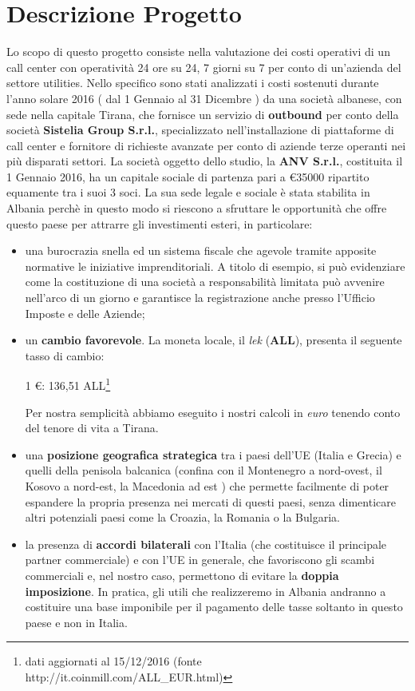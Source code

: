 \chapter{Descrizione Progetto}
\renewcommand{\thesection}{\arabic{section}}
Lo scopo di questo progetto consiste nella valutazione dei costi operativi di un call center con operatività 24 ore su 24, 7 giorni su 7 per conto di un'azienda del settore utilities. \newline
Nello specifico sono stati analizzati i costi sostenuti durante l'anno solare 2016 ( dal 1 Gennaio al 31 Dicembre ) da una società albanese, con sede nella capitale Tirana, che fornisce un servizio di \textbf{outbound} per conto della società \textbf{Sistelia Group S.r.l.}, specializzato nell'installazione di piattaforme di call center e fornitore di richieste avanzate per conto di aziende terze operanti nei più disparati settori. \newline
La società oggetto dello studio, la \textbf{\ac{ANV} S.r.l.}, costituita il 1 Gennaio 2016, ha un capitale sociale di partenza pari a \euro 35000 ripartito equamente tra i suoi 3 soci. La sua sede legale e sociale è stata stabilita in Albania perchè in questo modo si riescono a sfruttare le opportunità che offre questo paese per attrarre gli investimenti esteri, in particolare:
\begin{itemize}
\item una burocrazia snella ed un sistema fiscale che agevole tramite apposite normative le iniziative imprenditoriali.
		A titolo di esempio, si può evidenziare come la costituzione di una società a responsabilità limitata può avvenire nell'arco di un giorno e garantisce la registrazione anche presso l'Ufficio Imposte e delle Aziende;
\item un \textbf{cambio favorevole}. La moneta locale, il \textit{lek} (\textbf{ALL}), presenta il seguente tasso di cambio:
	\begin{center}
		1 \euro : 136,51 ALL\footnote{dati aggiornati al 15/12/2016 (fonte http://it.coinmill.com/ALL\_EUR.html)}
	\end{center}
	Per nostra semplicità abbiamo eseguito i nostri calcoli in \textit{euro} tenendo conto del tenore di vita a Tirana.
\item una \textbf{posizione geografica strategica} tra i paesi dell'\ac{UE} (Italia e Grecia) e quelli della penisola balcanica (confina con il Montenegro a nord-ovest, il Kosovo a nord-est, la Macedonia ad est ) che permette facilmente di poter espandere la propria presenza nei mercati di questi paesi, senza dimenticare altri potenziali paesi come la Croazia, la Romania o la Bulgaria.
\item la presenza di \textbf{accordi bilaterali} con l'Italia (che costituisce il principale partner commerciale) e con l'\ac{UE} in generale, che favoriscono gli scambi commerciali e, nel nostro caso, permettono di evitare la \textbf{doppia imposizione}. In pratica, gli utili che realizzeremo in Albania andranno a costituire una base imponibile per il pagamento delle tasse soltanto in questo paese e non in Italia.  
\end{itemize}  
